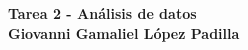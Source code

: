 \begin{center}
    \textbf{
        \textcolor{title}{Tarea 2 - Análisis de datos\\Giovanni Gamaliel López Padilla}}
\end{center}
